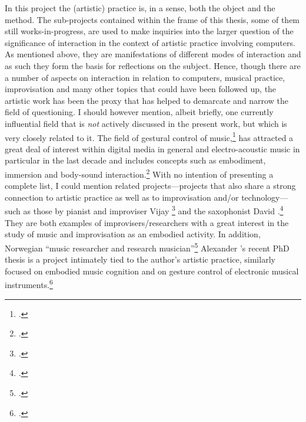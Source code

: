 In this project the (artistic) practice is, in a sense, both the object and the method. The sub-projects contained within the frame of this thesis, some of them still works-in-progress, are used to make inquiries into the larger question of the significance of interaction in the context of artistic practice involving computers. As mentioned above, they are manifestations of different modes of interaction and as such they form the basis for reflections on the subject. Hence, though there are a number of aspects on interaction in relation to computers, musical practice, improvisation and many other topics that could have been followed up, the artistic work has been the proxy that has helped to demarcate and narrow the field of questioning. I should however mention, albeit briefly, one currently influential field that is \emph{not} actively discussed in the present work, but which is very closely related to it. The field of gestural control of music,\footcite[For an overview, see][]{wanderley00} has attracted a great deal of interest within digital media in general and electro-acoustic music in particular in the last decade and includes concepts such as embodiment, immersion and body-sound interaction.\footcites(In the early and mid-1990s Virtual Reality technology, also in artistic practice, was a source of inspiration for thinking about the role and function of the body in human-technology interaction as well as concepts such as immersion.)()[See][]{moser96}[see also][]{wood98} With no intention of presenting a complete list, I could mention related projects---projects that also share a strong connection to artistic practice as well as to improvisation and/or technology---such as those by pianist and improviser Vijay \citeauthor{iyer08}\footcites[See the PhD thesis][]{iyer98}[See also][]{iyer08} and the saxophonist David \citeauthor{borgo05}.\footcite[Using British saxophonist Evan Parker as a point of demarcation the embodied mind is explored in][chap. 3]{borgo05} They are both examples of improvisers/researchers with a great interest in the study of music and improvisation as an embodied activity. In addition, Norwegian ``music researcher and research musician''\footcite{jensenius08:bio} Alexander \citeauthor{jensenius08}'s recent PhD thesis is a project intimately tied to the author's artistic practice, similarly focused on embodied music cognition and on gesture control of electronic musical instruments.\footcite[See][]{jensenius08}


